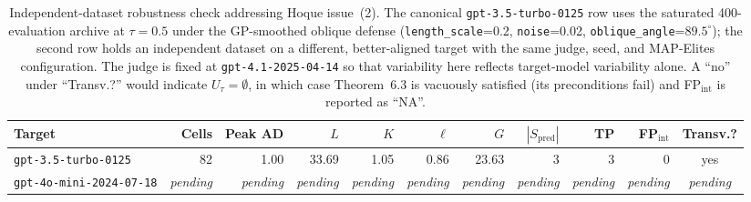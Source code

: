 %
\newcommand{\pending}{\textit{pending}}
\begin{table}[t]
  \centering
  \small
  \setlength{\tabcolsep}{4pt}
  \begin{tabular}{lrrrrrrrrrc}
    \toprule
    Target & Cells & Peak AD & $L$ & $K$ & $\ell$ & $G$ & $|S_{\mathrm{pred}}|$ & TP & FP$_{\mathrm{int}}$ & Transv.? \\
    \midrule
    \texttt{gpt-3.5-turbo-0125}    & 82        & 1.00      & 33.69     & 1.05      & 0.86      & 23.63     & 3         & 3        & 0        & yes \\
    \texttt{gpt-4o-mini-2024-07-18} & \pending & \pending  & \pending  & \pending  & \pending  & \pending  & \pending  & \pending & \pending & \pending \\
    \bottomrule
  \end{tabular}
  \caption{Independent-dataset robustness check addressing Hoque issue~(2).
    The canonical \texttt{gpt-3.5-turbo-0125} row uses the saturated 400-evaluation
    archive at $\tau=0.5$ under the GP-smoothed oblique defense
    (\texttt{length\_scale}=0.2, \texttt{noise}=0.02, \texttt{oblique\_angle}=$89.5^\circ$);
    the second row holds an independent dataset on a different, better-aligned target
    with the same judge, seed, and MAP-Elites configuration. The judge is fixed at
    \texttt{gpt-4.1-2025-04-14} so that variability here reflects target-model
    variability alone. A ``no'' under ``Transv.?'' would indicate $U_\tau=\emptyset$,
    in which case Theorem~6.3 is vacuously satisfied (its preconditions fail) and
    FP$_{\mathrm{int}}$ is reported as ``NA''.}
  \label{tab:independent-dataset}
\end{table}

